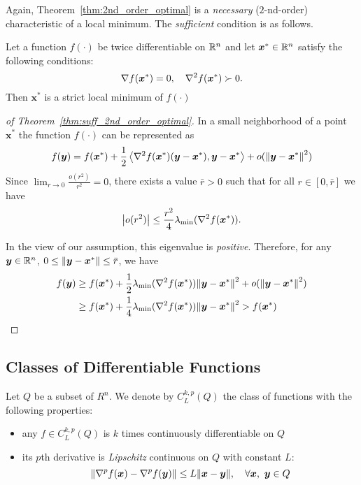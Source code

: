 Again, Theorem~\ref{thm:2nd_order_optimal} is a \emph{necessary} (\(2\)-nd-order) characteristic of a local minimum. The \emph{sufficient} condition is as follows.

\begin{thm}\label{thm:suff_2nd_order_optimal}
    Let a function \(f(\cdot)\) be twice differentiable on \(\mathbb{R}^n\) and let \(\bm{x}^* \in \mathbb{R}^n\) satisfy the following conditions:
    \begin{equation}
        \grad f(\bm{x}^*) = 0, \quad \hess f(\bm{x}^*) \succ 0.
    \end{equation}
    Then \(\bm{x}^*\) is a strict local minimum of \(f(\cdot)\)
\end{thm}

\begin{proof}[of Theorem~\ref{thm:suff_2nd_order_optimal}]
    In a small neighborhood of a point \(\bm{x}^*\) the function \(f(\cdot)\) can be represented as
    \[
        f(\bm{y}) = f(\bm{x}^*) + \frac{1}{2} \innerprod{\hess f(\bm{x}^*) (\bm{y} - \bm{x}^*)}{\bm{y} - \bm{x}^*} + o(\norm{\bm{y} - \bm{x}^*}^2)
    \]
    Since \(\lim_{r \to 0}\frac{o(r^2)}{r^2} = 0\), there exists a value \(\bar r > 0\) such that for all \(r \in [0, \bar r]\) we have
    \[
        \abs{o(r^2)} \le \frac{r^2}{4} \lambda_{\min} (\hess f(\bm{x}^*)).    
    \]

    In the view of our assumption, this eigenvalue is \emph{positive}. Therefore, for any \(\bm{y} \in \mathbb{R}^n\), \(0 \le \norm{\bm{y} - \bm{x}^*} \le \bar r\), we have
    \[
        \begin{aligned}
            f(\bm{y}) &\ge f(\bm{x}^*) + \frac{1}{2} \lambda_{\min} (\hess f(\bm{x}^*)) \norm{\bm{y} - \bm{x}^*}^2 + o(\norm{\bm{y} - \bm{x}^*}^2)\\
                      &\ge f(\bm{x}^*) + \frac{1}{4} \lambda_{\min} (\hess f(\bm{x}^*)) \norm{\bm{y} - \bm{x}^*}^2 > f(\bm{x}^*)
        \end{aligned}
    \]
\end{proof}

\subsection{Classes of Differentiable Functions}\label{subsec:classes-of-diff-funcs}
\begin{defn}\label{defn:classes-diff-funcs}
    Let \(Q\) be a subset of \(R^n\). We denote by \(C^{k,p}_L(Q)\) the class of functions with the following properties:
    \begin{itemize}
        \item any \(f \in C^{k, p}_L(Q)\) is \(k\) times continuously differentiable on \(Q\) 
        \item its \(p\)th derivative is \emph{Lipschitz} continuous on \(Q\) with constant \(L\):
            \[
                \norm{\nabla^p f(\bm{x}) - \nabla^p f(\bm y)} \le L \norm{\bm x - \bm y}, \quad \forall \bm x, ~\bm y \in Q
            \]
    \end{itemize}
\end{defn}

